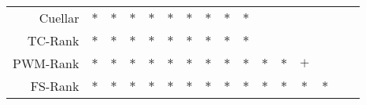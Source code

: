 \documentclass[11pt]{article}
\begin{document}
\begin{table}[h!]
\begin{center}
\begin{tabular}{ rccccccccccccccc }
    Cuellar & $*$ & $*$ & $*$ & $*$ & $*$ & $*$ & $*$ & $*$ & $*$ &     &     &     &     &     &     \\
    TC-Rank & $*$ & $*$ & $*$ & $*$ & $*$ & $*$ & $*$ & $*$ & $*$ &     &     &     &     &     &     \\
    PWM-Rank & $*$ & $*$ & $*$ & $*$ & $*$ & $*$ & $*$ & $*$ & $*$ & $*$ & $*$ & $+$ &     &     &     \\
    FS-Rank & $*$ & $*$ & $*$ & $*$ & $*$ & $*$ & $*$ & $*$ & $*$ & $*$ & $*$ & $*$ & $*$ &     &     \\
    \hline
  \end{tabular}
\end{center}
\vspace{0.0cm}
\end{table}

\clearpage
\end{document}
